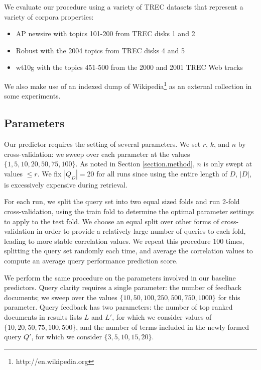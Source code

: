 \documentclass{sig-alternate}
\begin{document}
We evaluate our procedure using a variety of TREC datasets that represent a variety of corpora properties:

\begin{itemize}
	\item AP newsire with topics 101-200 from TREC disks 1 and 2
	\item Robust with the 2004 topics from TREC disks 4 and 5
	\item wt10g with the topics 451-500 from the 2000 and 2001 TREC Web tracks
\end{itemize}

We also make use of an indexed dump of Wikipedia\footnote{http://en.wikipedia.org} as an external collection in some experiments.

\subsection{Parameters}\label{section.evaluation.runs}

Our predictor requires the setting of several parameters. We set $r$, $k$, and $n$ by cross-validation: we sweep over each parameter at the values $\{1, 5, 10, 20, 50, 75, 100\}$. As noted in Section \ref{section.method}, $n$ is only swept at values $\leq r$. We fix $|Q_D| = 20$ for all runs since using the entire length of $D$, $|D|$, is excessively expensive during retrieval.

For each run, we split the query set into two equal sized folds and run 2-fold cross-validation, using the train fold to determine the optimal parameter settings to apply to the test fold. We choose an equal split over other forms of cross-validation in order to provide a relatively large number of queries to each fold, leading to more stable correlation values. We repeat this procedure 100 times, splitting the query set randomly each time, and average the correlation values to compute an average query performance prediction score.

We perform the same procedure on the parameters involved in our baseline predictors. Query clarity requires a single parameter: the number of feedback documents; we sweep over the values $\{10, 50, 100, 250, 500, 750, 1000\}$ for this parameter. Query feedback has two parameters: the number of top ranked documents in results lists $L$ and $L'$, for which we consider values of $\{10, 20, 50, 75, 100, 500\}$, and the number of terms included in the newly formed query $Q'$, for which we consider $\{3, 5, 10, 15, 20\}$.
\end{document}
